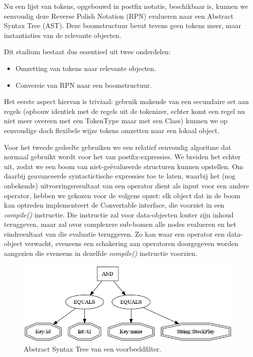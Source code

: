 Nu een lijst van tokens, opgebouwd in postfix notatie, beschikbaar is, kunnen we eenvoudig deze Reverse Polish Notation (RPN) evalueren naar een Abstract Syntax Tree (AST). Deze boomstructuur bevat tevens geen tokens meer, maar instantiaties van de relevante objecten.

Dit stadium bestaat dus essentieel uit twee onderdelen:
\begin{itemize}
\item Omzetting van tokens naar relevante objecten.
\item Conversie van RPN naar een boomstructuur.
\end{itemize}

Het eerste aspect hiervan is triviaal: gebruik makende van een secundaire set aan regels (opbouw identiek met de regels uit de tokenizer, echter komt een regel nu niet meer overeen met een TokenType maar met een Class) kunnen we op eenvoudige doch flexibele wijze tokens omzetten naar een lokaal object.

Voor het tweede gedeelte gebruiken we een relatief eenvoudig algoritme dat normaal gebruikt wordt voor het  van postfix-expressies. We breiden het echter uit, zodat we een boom van niet-ge\"evalueerde structuren kunnen opstellen. Om daarbij geavanceerde syntactictische expressies toe te laten, waarbij het (nog onbekende) uitvoeringsresultaat van een operator dient als input voor een andere operator, hebben we gekozen voor de volgens opzet: elk object dat in de boom kan optreden implementeert de Convertable interface, die voorziet in een \emph{compile()} instructie. Die instructie zal voor data-objecten louter zijn inhoud teruggeven, maar zal ovor complexere sub-bomen alle nodes evalueren en het eindresultaat van die evaluatie teruggeven. Zo kan waar een operator een data-object verwacht, eveneens een schakering aan operatoren doorgegeven worden aangezien die eveneens in dezelfde \emph{compile()} instructie voorzien.

\begin{figure}[h!]
	\centering
		\includegraphics[width=\textwidth]{images/realisatie/AST}
	\caption{Abstract Syntax Tree van een voorbeeldfilter.}
\end{figure}

